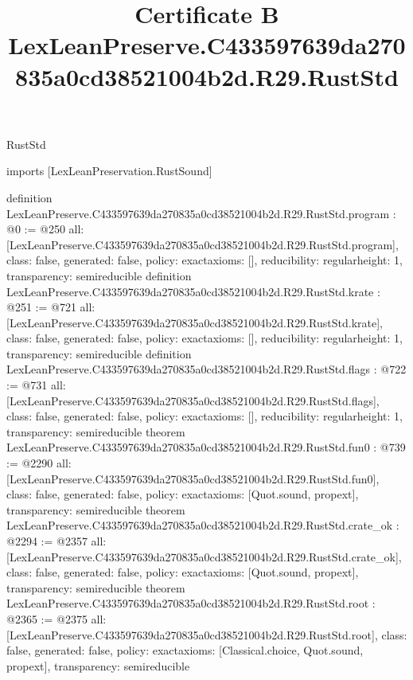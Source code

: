 \begin{lexlean}{RustStd}
\title{Certificate B LexLeanPreserve.C433597639da270835a0cd38521004b2d.R29.RustStd}
\begin{coremodule}
imports [LexLeanPreservation.RustSound]

definition LexLeanPreserve.C433597639da270835a0cd38521004b2d.R29.RustStd.program : @0 := @250 {
  all: [LexLeanPreserve.C433597639da270835a0cd38521004b2d.R29.RustStd.program],
  class: false,
  generated: false,
  policy: exact{axioms: []},
  reducibility: regular{height: 1},
  transparency: semireducible
}
definition LexLeanPreserve.C433597639da270835a0cd38521004b2d.R29.RustStd.krate : @251 := @721 {
  all: [LexLeanPreserve.C433597639da270835a0cd38521004b2d.R29.RustStd.krate],
  class: false,
  generated: false,
  policy: exact{axioms: []},
  reducibility: regular{height: 1},
  transparency: semireducible
}
definition LexLeanPreserve.C433597639da270835a0cd38521004b2d.R29.RustStd.flags : @722 := @731 {
  all: [LexLeanPreserve.C433597639da270835a0cd38521004b2d.R29.RustStd.flags],
  class: false,
  generated: false,
  policy: exact{axioms: []},
  reducibility: regular{height: 1},
  transparency: semireducible
}
theorem LexLeanPreserve.C433597639da270835a0cd38521004b2d.R29.RustStd.fun0 : @739 := @2290 {
  all: [LexLeanPreserve.C433597639da270835a0cd38521004b2d.R29.RustStd.fun0],
  class: false,
  generated: false,
  policy: exact{axioms: [Quot.sound, propext]},
  transparency: semireducible
}
theorem LexLeanPreserve.C433597639da270835a0cd38521004b2d.R29.RustStd.crate_ok : @2294 := @2357 {
  all: [LexLeanPreserve.C433597639da270835a0cd38521004b2d.R29.RustStd.crate_ok],
  class: false,
  generated: false,
  policy: exact{axioms: [Quot.sound, propext]},
  transparency: semireducible
}
theorem LexLeanPreserve.C433597639da270835a0cd38521004b2d.R29.RustStd.root : @2365 := @2375 {
  all: [LexLeanPreserve.C433597639da270835a0cd38521004b2d.R29.RustStd.root],
  class: false,
  generated: false,
  policy: exact{axioms: [Classical.choice, Quot.sound, propext]},
  transparency: semireducible
}


\end{coremodule}
\end{lexlean}
